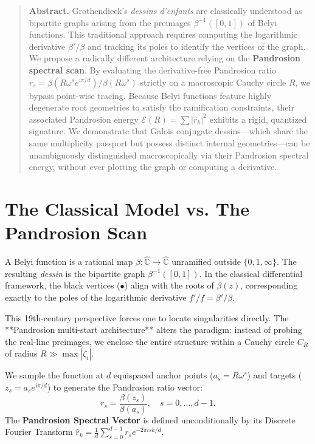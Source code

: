 \documentclass[10pt,a4paper,oneside]{book}
\theoremstyle{definition}
\theoremstyle{remark}
\newenvironment{abstract}{\begin{quote}\small\textbf{Abstract.}}{\end{quote}}
\begin{document}
\begin{abstract}
Grothendieck's \emph{dessins d'enfants} are classically understood as bipartite graphs arising from the preimages $\beta^{-1}([0,1])$ of Belyi functions. This traditional approach requires computing the logarithmic derivative $\beta'/\beta$ and tracking its poles to identify the vertices of the graph. We propose a radically different architecture relying on the \textbf{Pandrosion spectral scan}. By evaluating the derivative-free Pandrosion ratio $r_s = \beta(R\omega^s e^{i\pi/d})/\beta(R\omega^s)$ strictly on a macroscopic Cauchy circle $R$, we bypass point-wise tracing. Because Belyi functions feature highly degenerate root geometries to satisfy the ramification constraints, their associated Pandrosion energy $\mathcal{E}(R) = \sum |\hat{r}_k|^2$ exhibits a rigid, quantized signature. We demonstrate that Galois conjugate dessins---which share the same multiplicity passport but possess distinct internal geometries---can be unambiguously distinguished macroscopically via their Pandrosion spectral energy, without ever plotting the graph or computing a derivative.
\end{abstract}

\section{The Classical Model vs. The Pandrosion Scan}

A Belyi function is a rational map $\beta: \hat{\mathbb{C}} \to \hat{\mathbb{C}}$ unramified outside $\{0, 1, \infty\}$. The resulting \emph{dessin} is the bipartite graph $\beta^{-1}([0, 1])$. In the classical differential framework, the black vertices ($\bullet$) align with the roots of $\beta(z)$, corresponding exactly to the poles of the logarithmic derivative $f'/f = \beta'/\beta$. 

This 19th-century perspective forces one to locate singularities directly. The **Pandrosion multi-start architecture** alters the paradigm: instead of probing the real-line preimages, we enclose the entire structure within a Cauchy circle $C_R$ of radius $R \gg \max|\zeta_i|$. 

We sample the function at $d$ equispaced anchor points ($a_s = R\omega^s$) and targets ($z_s = a_s e^{i\pi/d}$) to generate the Pandrosion ratio vector:
\begin{equation}
r_s = \frac{\beta(z_s)}{\beta(a_s)}, \quad s = 0, \dots, d-1.
\end{equation}
The \textbf{Pandrosion Spectral Vector} is defined unconditionally by its Discrete Fourier Transform $\hat{r}_k = \frac{1}{d} \sum_{s=0}^{d-1} r_s e^{-2\pi i s k / d}$.
\end{document}
